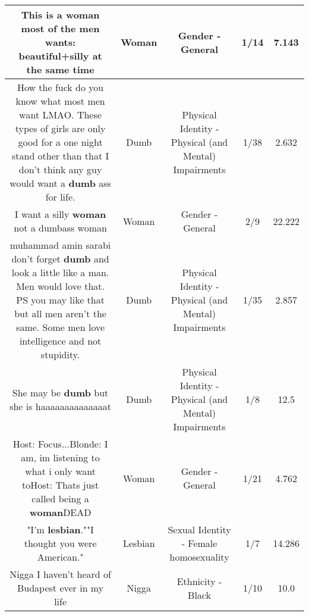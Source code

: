 \documentclass[11pt]{article}
\newlength\mylength
\begin{document}
\begin{center}
\begin{longtable}{|C{.65\mylength}|C{.30\mylength}|C{.12\mylength}|C{.12\mylength}|C{.12\mylength}|}
  \small This is a \textbf{woman} most of the men wants: beautiful+silly at the same time\normalsize   & Woman & Gender - General & 1/14 & 7.143 \\  \hline
  \small How the fuck do you know what most  men want LMAO. These types of girls are only good for a one night stand other than that I don't think any guy would want a \textbf{dumb} ass for life.\normalsize   & Dumb & Physical Identity - Physical (and Mental) Impairments & 1/38 & 2.632 \\  \hline
  \small I want a silly \textbf{woman} not a dumbass woman\normalsize   & Woman & Gender - General & 2/9 & 22.222 \\  \hline
  \small muhammad amin sarabi don't forget \textbf{dumb} and look a little like a man. Men would love that. PS you may like that but all men aren't the same. Some men love intelligence and not stupidity.\normalsize   & Dumb & Physical Identity - Physical (and Mental) Impairments & 1/35 & 2.857 \\  \hline
  \small She may be \textbf{dumb} but she is haaaaaaaaaaaaaat\normalsize   & Dumb & Physical Identity - Physical (and Mental) Impairments & 1/8 & 12.5 \\  \hline
  \small Host: Focus...Blonde: I am, im listening to what i only want toHost: Thats just called being a \textbf{woman}DEAD\normalsize   & Woman & Gender - General & 1/21 & 4.762 \\  \hline
  \small "I'm \textbf{lesbian}.""I thought you were American."\normalsize   & Lesbian & Sexual Identity - Female homosexuality & 1/7 & 14.286 \\  \hline
  \small Nigga I haven't heard of Budapest ever in my life\normalsize   & Nigga & Ethnicity - Black & 1/10 & 10.0 \\  \hline

\end{longtable}
\end{center}
\end{document}
